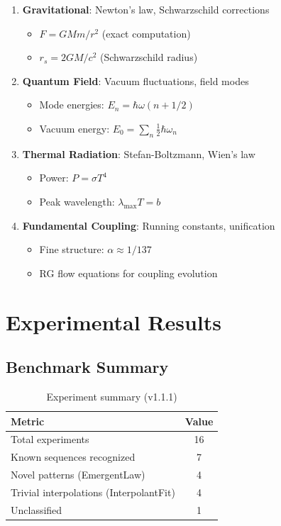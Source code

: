 \documentclass[11pt,a4paper]{article}
\begin{document}
\begin{enumerate}
    \item \textbf{Gravitational}: Newton's law, Schwarzschild corrections
    \begin{itemize}
        \item $F = G M m / r^2$ (exact computation)
        \item $r_s = 2GM/c^2$ (Schwarzschild radius)
    \end{itemize}
    
    \item \textbf{Quantum Field}: Vacuum fluctuations, field modes
    \begin{itemize}
        \item Mode energies: $E_n = \hbar \omega (n + 1/2)$
        \item Vacuum energy: $E_0 = \sum_{n} \frac{1}{2} \hbar \omega_n$
    \end{itemize}
    
    \item \textbf{Thermal Radiation}: Stefan-Boltzmann, Wien's law
    \begin{itemize}
        \item Power: $P = \sigma T^4$
        \item Peak wavelength: $\lambda_{\text{max}} T = b$
    \end{itemize}
    
    \item \textbf{Fundamental Coupling}: Running constants, unification
    \begin{itemize}
        \item Fine structure: $\alpha \approx 1/137$
        \item RG flow equations for coupling evolution
    \end{itemize}
\end{enumerate}

\section{Experimental Results}

\subsection{Benchmark Summary}

\begin{table}[h]
\centering
\begin{tabular}{|l|c|}
\hline
\textbf{Metric} & \textbf{Value} \\
\hline
Total experiments & 16 \\
Known sequences recognized & 7 \\
Novel patterns (EmergentLaw) & 4 \\
Trivial interpolations (InterpolantFit) & 4 \\
Unclassified & 1 \\
\hline
\end{tabular}
\caption{Experiment summary (v1.1.1)}
\end{table}
\end{document}
